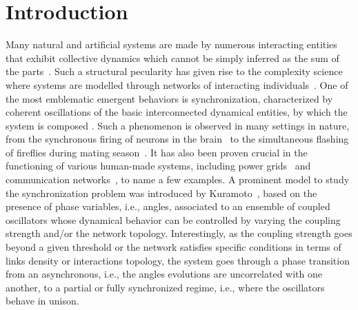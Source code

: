 \documentclass[prx,twocolumn,amsmath,noshowkeys,noshowpacs,amssymb]{revtex4-2}
\begin{document}
\maketitle

\vspace{0.8cm}

\section{Introduction}
\label{sec:intro}
\noindent

Many natural and artificial systems are made by numerous interacting entities that exhibit collective dynamics which cannot be simply inferred as the sum of the parts~\cite{Simon1991}. Such a structural pecularity has given rise to the complexity science where system{s} are modelled through networks of interacting individuals~\cite{newman2010networks}. One of the most emblematic emergent behaviors is synchronization, characterized by coherent oscillations of the basic interconnected dynamical entities, by which the system is composed \cite{pikovskij_synchronization:_2007, arenas_synchronization_2008}. Such a phenomenon is observed in many settings in nature, from the synchronous firing of neurons in the brain~\cite{Chouzouris} to the simultaneous flashing of fireflies during mating season~\cite{john_synchronous_1976}{. It has also been proven} crucial in the functioning of various human-made systems, including power grids~\cite{motter_spontaneous_2013} and communication networks~\cite{Sivrikaya_Yener}, to name a few examples.  
A prominent model to study the synchronization problem was introduced by Kuramoto~\cite{kuramoto, kuramoto_book}, based on the presence of phase variables, i.e., angles, associated to an ensemble of coupled oscillators whose dynamical behavior can be controlled by varying the coupling strength and/or the network topology. Interestingly, as the coupling strength goes beyond a given threshold or the network satisfies specific conditions in terms of links density or interactions topology, the system goes through a phase transition from an asynchronous, i.e., the angles evolutions are uncorrelated with one another, to a partial or fully synchronized regime, i.e., where the oscillators behave in unison. 
\end{document}

